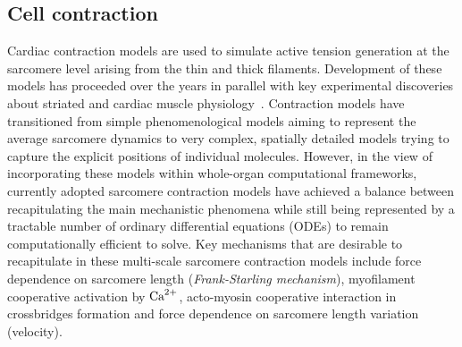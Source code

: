 %
%
%
\subsection{Cell contraction}\label{sec:mathcellcontr}
Cardiac contraction models are used to simulate active tension generation at the sarcomere level arising from the thin and thick filaments. Development of these models has proceeded over the years in parallel with key experimental discoveries about striated and cardiac muscle physiology~\cite{Niederer:2019}. Contraction models have transitioned from simple phenomenological models aiming to represent the average sarcomere dynamics to very complex, spatially detailed models trying to capture the explicit positions of individual molecules. However, in the view of incorporating these models within whole-organ computational frameworks, currently adopted sarcomere contraction models have achieved a balance between recapitulating the main mechanistic phenomena while still being represented by a tractable number of ordinary differential equations (\acs{ODE}s) to remain computationally efficient to solve. Key mechanisms that are desirable to recapitulate in these multi-scale sarcomere contraction models include force dependence on sarcomere length (\textit{Frank-Starling mechanism}), myofilament cooperative activation by $\textrm{Ca}^{2+}$, acto-myosin cooperative interaction in crossbridges formation and force dependence on sarcomere length variation (velocity).




